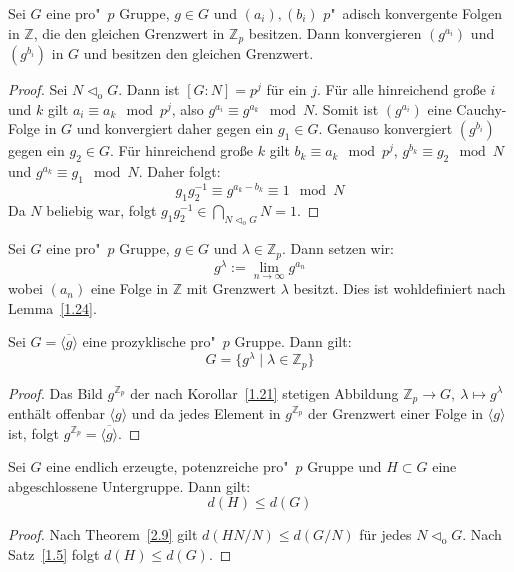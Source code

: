 \documentclass[11pt,a4paper,openany]{memoir}
\begin{document}
\begin{lemma}\label{1.24}
Sei $G$ eine pro"~$p$ Gruppe, $g\in G$ und $(a_i),(b_i)$ $p$"~adisch konvergente Folgen in $\mathbb{Z}$, die den gleichen Grenzwert in $\mathbb{Z}_p$ besitzen. Dann konvergieren $(g^{a_i})$ und $(g^{b_i})$ in $G$ und besitzen den gleichen Grenzwert.
\end{lemma}

\begin{proof}
Sei $N\lhd_\text{o}G$. Dann ist $[G:N]=p^j$ für ein $j$. Für alle hinreichend große $i$ und $k$ gilt $a_i\equiv a_k\mod p^j$, also $g^{a_i}\equiv g^{a_k}\mod N$. Somit ist $(g^{a_i})$ eine Cauchy-Folge in $G$ und konvergiert daher gegen ein $g_1\in G$. Genauso konvergiert $(g^{b_i})$ gegen ein $g_2\in G$. Für hinreichend große $k$ gilt $b_k\equiv a_k\mod p^j$, $g^{b_k}\equiv g_2\mod N$ und $g^{a_k}\equiv g_1\mod N$. Daher folgt:
\[g_1^{}g_2^{-1}\equiv g^{a_k-b_k}\equiv 1\mod N \]
Da $N$ beliebig war, folgt $g_1^{}g_2^{-1}\in\bigcap_{N\lhd_\text{o}G} N=1$.
\end{proof}

\begin{definition}
Sei $G$ eine pro"~$p$ Gruppe, $g\in G$ und $\lambda\in\mathbb{Z}_p$. Dann setzen wir:
\[g^\lambda :=\lim_{n\to\infty}g^{a_n} \]
wobei $(a_n)$ eine Folge in $\mathbb{Z}$ mit Grenzwert $\lambda$ besitzt. Dies ist wohldefiniert nach Lemma~\ref{1.24}.
\end{definition}

\begin{proposition}\label{1.28}
Sei $G=\overline{\langle g\rangle}$ eine prozyklische pro"~$p$ Gruppe. Dann gilt:
\[G= \{g^\lambda\mid\lambda\in\mathbb{Z}_p \}\]
\end{proposition}

\begin{proof}
Das Bild $g^{\mathbb{Z}_p}$ der nach Korollar~\ref{1.21} stetigen Abbildung $\mathbb{Z}_p\to G,\ \lambda\mapsto g^\lambda$ enthält offenbar $\langle g\rangle$ und da jedes Element in $g^{\mathbb{Z}_p}$ der Grenzwert einer Folge in $\langle g\rangle$ ist, folgt $g^{\mathbb{Z}_p}=\overline{\langle g\rangle}$.
\end{proof}

\begin{theorem}\label{3.8}
Sei $G$ eine endlich erzeugte, potenzreiche pro"~$p$ Gruppe und $H\subset G$ eine abgeschlossene Untergruppe. Dann gilt: \[d(H)\leq d(G)\]
\end{theorem}

\begin{proof}
Nach Theorem~\ref{2.9} gilt $d(HN/N)\leq d(G/N)$ für jedes $N\lhd_\text{o}G$. Nach Satz~\ref{1.5} folgt $d(H)\leq d(G)$.
\end{proof}
\end{document}
